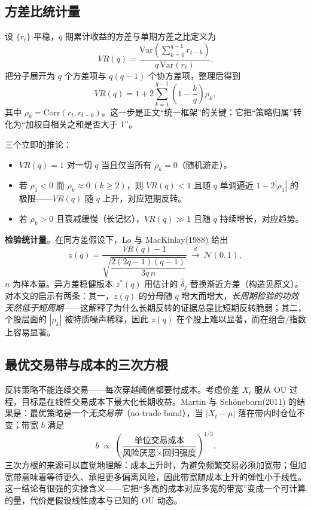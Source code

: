 \subsection{方差比统计量}

设 $\{r_t\}$ 平稳，$q$ 期累计收益的方差与单期方差之比定义为
\begin{equation}
VR(q)=\frac{\mathrm{Var}\left(\sum_{k=0}^{q-1}r_{t-k}\right)}{q\,\mathrm{Var}(r_t)}.
\end{equation}
把分子展开为 $q$ 个方差项与 $q(q-1)$ 个协方差项，整理后得到
\begin{equation}
VR(q)=1+2\sum_{k=1}^{q-1}\left(1-\frac{k}{q}\right)\rho_k ,
\end{equation}
其中 $\rho_k=\mathrm{Corr}(r_t,r_{t-k})$。这一步是正文“统一框架”的关键：它把“策略归属”转化为“加权自相关之和是否大于 1”。

三个立即的推论：

\begin{itemize}[leftmargin=2.2em]
  \item $VR(q)=1$ 对一切 $q$ 当且仅当所有 $\rho_k=0$（随机游走）。
  \item 若 $\rho_1<0$ 而 $\rho_k\approx0\ (k\ge2)$，则 $VR(q)<1$ 且随 $q$ 单调逼近 $1-2|\rho_1|$ 的极限——$VR(q)$ 随 $q$ 上升，对应短期反转。
  \item 若 $\rho_k>0$ 且衰减缓慢（长记忆），$VR(q)\gg1$ 且随 $q$ 持续增长，对应趋势。
\end{itemize}

\textbf{检验统计量}。在同方差假设下，Lo 与 MacKinlay(1988) 给出
\begin{equation}
z(q)=\frac{VR(q)-1}{\sqrt{\dfrac{2(2q-1)(q-1)}{3q\,n}}}\ \xrightarrow{d}\ \mathcal N(0,1),
\end{equation}
$n$ 为样本量。异方差稳健版本 $z^*(q)$ 用估计的 $\hat\delta_j$ 替换渐近方差（构造见原文）。对本文的启示有两条：其一，$z(q)$ 的分母随 $q$ 增大而增大，\emph{长周期检验的功效天然低于短周期}——这解释了为什么长期反转的证据总是比短期反转脆弱；其二，个股层面的 $|\rho_k|$ 被特质噪声稀释，因此 $z(q)$ 在个股上难以显著，而在组合/指数上容易显著\cite{lomackinlay1988,richardson1993}。

\subsection{最优交易带与成本的三次方根}

反转策略不能连续交易——每次穿越阈值都要付成本。考虑价差 $X_t$ 服从 OU 过程，目标是在线性交易成本下最大化长期收益。Martin 与 Sch\"oneborn(2011) 的结果是：最优策略是一个\emph{无交易带}（no-trade band），当 $|X_t-\mu|$ 落在带内时仓位不变；带宽 $b$ 满足
\begin{equation}
b\;\propto\;\left(\frac{\text{单位交易成本}}{\text{风险厌恶}\times \text{回归强度}}\right)^{1/3}.
\end{equation}
三次方根的来源可以直觉地理解：成本上升时，为避免频繁交易必须加宽带；但加宽带意味着等待更久、承担更多偏离风险，因此带宽随成本上升的弹性小于线性。这一结论有很强的实操含义——它把“多高的成本对应多宽的带宽”变成一个可计算的量，代价是假设线性成本与已知的 OU 动态。

